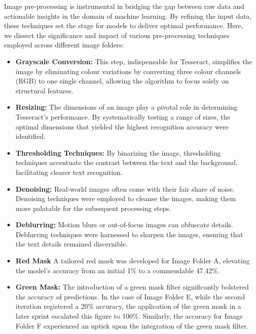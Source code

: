 Image pre-processing is instrumental in bridging the gap between raw data and actionable insights in the domain of machine learning. By refining the input data, these techniques set the stage for models to deliver optimal performance. Here, we dissect the significance and impact of various pre-processing techniques employed across different image folders:

\begin{itemize}
    \item \textbf{Grayscale Conversion:} This step, indispensable for Tesseract, simplifies the image by eliminating colour variations by converting three colour channels (RGB) to one single channel, allowing the algorithm to focus solely on structural features.

    \item \textbf{Resizing:} The dimensions of an image play a pivotal role in determining Tesseract's performance. By systematically testing a range of sizes, the optimal dimensions that yielded the highest recognition accuracy were identified.

    \item \textbf{Thresholding Techniques:} By binarizing the image, thresholding techniques accentuate the contrast between the text and the background, facilitating clearer text recognition.

    \item \textbf{Denoising:} Real-world images often come with their fair share of noise. Denoising techniques were employed to cleanse the images, making them more palatable for the subsequent processing steps.

    \item \textbf{Deblurring:} Motion blurs or out-of-focus images can obfuscate details. Deblurring techniques were harnessed to sharpen the images, ensuring that the text details remained discernible.

    \item \textbf{Red Mask} A tailored red mask was developed for Image Folder A, elevating the model's accuracy from an initial 1\% to a commendable 47.42\%.

    \item \textbf{Green Mask:} The introduction of a green mask filter significantly bolstered the accuracy of predictions. In the case of Image Folder E, while the second iteration registered a 20\% accuracy, the application of the green mask in a later sprint escalated this figure to 100\%. Similarly, the accuracy for Image Folder F experienced an uptick upon the integration of the green mask filter.

\end{itemize}

